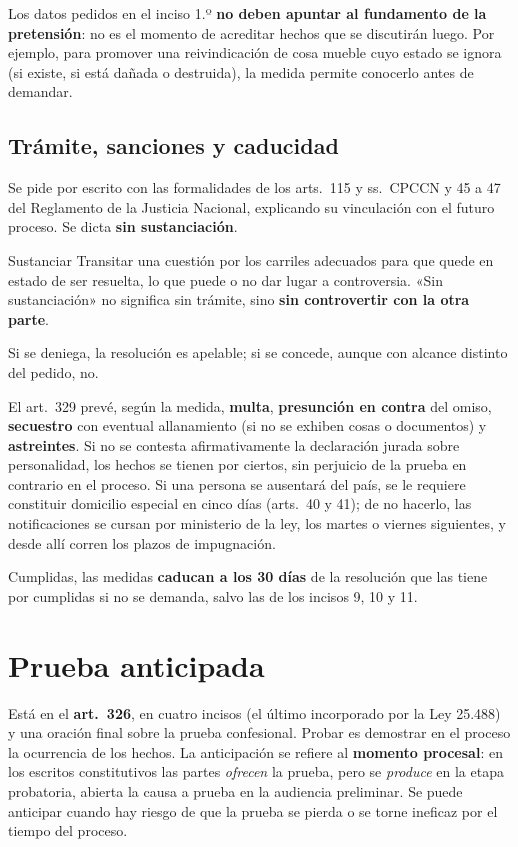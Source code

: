 \documentclass[12pt,oneside]{book}
\begin{document}
Los datos pedidos en el inciso 1.º \textbf{no deben apuntar al fundamento de la pretensión}: no es el momento de acreditar hechos que se discutirán luego. Por ejemplo, para promover una reivindicación de cosa mueble cuyo estado se ignora (si existe, si está dañada o destruida), la medida permite conocerlo antes de demandar.

\subsection{Trámite, sanciones y caducidad}

Se pide por escrito con las formalidades de los arts.~115 y ss.\ CPCCN y 45 a 47 del Reglamento de la Justicia Nacional, explicando su vinculación con el futuro proceso. Se dicta \textbf{sin sustanciación}.

\begin{definicion}{Sustanciar}
Transitar una cuestión por los carriles adecuados para que quede en estado de ser resuelta, lo que puede o no dar lugar a controversia. «Sin sustanciación» no significa sin trámite, sino \textbf{sin controvertir con la otra parte}.
\end{definicion}

Si se deniega, la resolución es apelable; si se concede, aunque con alcance distinto del pedido, no.

El art.~329 prevé, según la medida, \textbf{multa}, \textbf{presunción en contra} del omiso, \textbf{secuestro} con eventual allanamiento (si no se exhiben cosas o documentos) y \textbf{astreintes}. Si no se contesta afirmativamente la declaración jurada sobre personalidad, los hechos se tienen por ciertos, sin perjuicio de la prueba en contrario en el proceso. Si una persona se ausentará del país, se le requiere constituir domicilio especial en cinco días (arts.~40 y 41); de no hacerlo, las notificaciones se cursan por ministerio de la ley, los martes o viernes siguientes, y desde allí corren los plazos de impugnación.

Cumplidas, las medidas \textbf{caducan a los 30 días} de la resolución que las tiene por cumplidas si no se demanda, salvo las de los incisos 9, 10 y 11.

\section{Prueba anticipada}

Está en el \textbf{art.~326}, en cuatro incisos (el último incorporado por la Ley 25.488) y una oración final sobre la prueba confesional. Probar es demostrar en el proceso la ocurrencia de los hechos. La anticipación se refiere al \textbf{momento procesal}: en los escritos constitutivos las partes \emph{ofrecen} la prueba, pero se \emph{produce} en la etapa probatoria, abierta la causa a prueba en la audiencia preliminar. Se puede anticipar cuando hay riesgo de que la prueba se pierda o se torne ineficaz por el tiempo del proceso.
\end{document}
